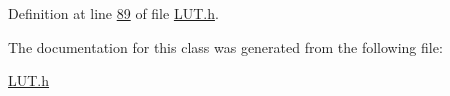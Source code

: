 Definition at line \hyperlink{_l_u_t_8h_source_l00089}{89} of file \hyperlink{_l_u_t_8h_source}{L\+U\+T.\+h}.



The documentation for this class was generated from the following file\+:\begin{DoxyCompactItemize}
\item 
\hyperlink{_l_u_t_8h}{L\+U\+T.\+h}\end{DoxyCompactItemize}
